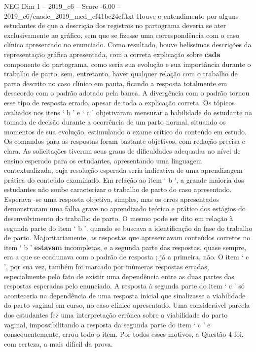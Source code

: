 \begin{textsample}{NEG Dim 1 – 2019\_c6 – Score -6.00 – 2019\_c6/enade\_2019\_med\_cf41be24ef.txt}
Houve o entendimento por alguns estudantes de que a descrição dos registros no partograma deveria se ater exclusivamente ao gráfico, sem que se fizesse uma correspondência com o caso clínico apresentado no enunciado.
Como resultado, houve belíssimas descrições da representação gráfica apresentada, com a correta explicação sobre \textbf{cada} componente do partograma, como seria sua evolução e sua importância durante o trabalho de parto, sem, entretanto, haver qualquer relação com o trabalho de parto descrito no caso clínico em pauta, ficando a resposta totalmente em desacordo com o padrão adotado pela banca.
A divergência com o padrão tornou esse tipo de resposta errado, apesar de toda a explicação correta.
Os tópicos avaliados nos itens ‘ b ’ e ‘ c ’ objetivaram mensurar a habilidade do estudante na tomada de decisão durante a ocorrência de um parto normal, situando os momentos de sua evolução, estimulando o exame crítico do conteúdo em estudo.
Os comandos para as respostas foram bastante objetivos, com redação precisa e clara.
As solicitações tiveram seus graus de dificuldades adequadas ao nível de ensino esperado para os estudantes, apresentando uma linguagem contextualizada, cuja resolução esperada seria indicativa de uma aprendizagem prática do conteúdo examinado.
Em relação ao item ‘ b ’, a grande maioria dos estudantes não soube caracterizar o trabalho de parto do caso apresentado.
Esperava -se uma resposta objetiva, simples, mas os erros apresentados demonstraram uma falha grave no aprendizado teórico e prático dos estágios do desenvolvimento do trabalho de parto.
O mesmo pode ser dito em relação à segunda parte do item ‘ b ’, quando se buscava a identificação da fase do trabalho de parto.
Majoritariamente, as respostas que apresentavam conteúdos corretos no item ‘ b ’ \textbf{estavam} incompletas, e a segunda parte das respostas, quase sempre, era a que se coadunava com o padrão de resposta ; já a primeira, não.
O item ‘ c ’, por sua vez, também foi marcado por inúmeras respostas erradas, especialmente pelo fato de existir uma dependência entre as duas partes das respostas esperadas pelo enunciado.
A resposta à segunda parte do item ‘ c ’ só aconteceria na dependência de uma resposta inicial que sinalizasse a viabilidade do parto vaginal em curso, no caso clínico apresentado.
Uma considerável parcela dos estudantes fez uma interpretação errônea sobre a viabilidade do parto vaginal, impossibilitando a resposta da segunda parte do item ‘ c ’ e consequentemente, errou todo o item.
Por todos esses motivos, a Questão 4 foi, com certeza, a mais difícil da prova.

\end{textsample}
